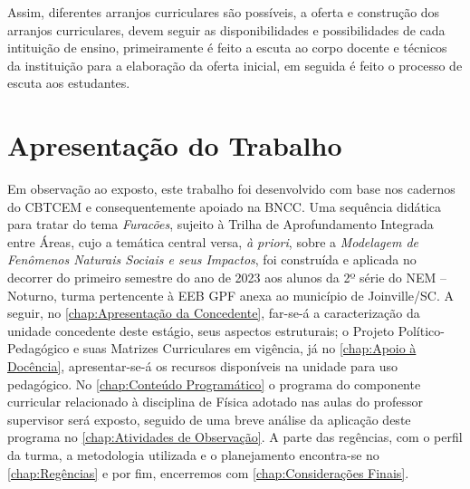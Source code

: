 Assim, diferentes arranjos curriculares são possíveis, a oferta e construção dos arranjos curriculares, devem seguir as disponibilidades e possibilidades de cada intituição de ensino, primeiramente é feito a escuta ao corpo docente e técnicos da instituição para a elaboração da oferta inicial, em seguida é feito o processo de escuta aos estudantes.

\section{Apresentação do Trabalho} %
\label{sec:Apresentação do Trabalho}

Em observação ao exposto, este trabalho foi desenvolvido com base nos cadernos do \ac{CBTCEM} e consequentemente apoiado na \ac{BNCC}. Uma sequência didática para tratar do tema \textit{Furacões}, sujeito à Trilha de Aprofundamento Integrada entre Áreas, cujo a temática central versa, \textit{à priori}, sobre a \textit{Modelagem de Fenômenos Naturais Sociais e seus Impactos}, foi construída e aplicada no decorrer do primeiro semestre do ano de 2023 aos alunos da 2º série do \ac{NEM} -- Noturno, turma pertencente à \ac{EEB} \ac{GPF} anexa ao município de Joinville/SC. A seguir, no \autoref{chap:Apresentação da Concedente}, far-se-á a caracterização da unidade concedente deste estágio, seus aspectos estruturais; o Projeto Político-Pedagógico e suas Matrizes Curriculares em vigência, já no \autoref{chap:Apoio à Docência}, apresentar-se-á os recursos disponíveis na unidade para uso pedagógico. No \autoref{chap:Conteúdo Programático} o programa do componente curricular relacionado à disciplina de Física adotado nas aulas do professor supervisor será exposto, seguido de uma breve análise da aplicação deste programa no \autoref{chap:Atividades de Observação}. A parte das regências, com o perfil da turma, a metodologia utilizada e o planejamento encontra-se no \autoref{chap:Regências} e por fim, encerremos com \autoref{chap:Considerações Finais}.





